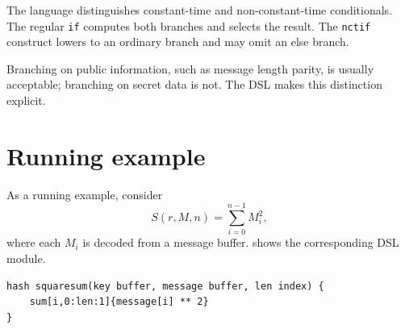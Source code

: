The language distinguishes constant-time and non-constant-time conditionals. The regular \texttt{if} computes both branches and selects the result. The \texttt{nctif} construct lowers to an ordinary branch and may omit an else branch.

Branching on public information, such as message length parity, is usually acceptable; branching on secret data is not. The DSL makes this distinction explicit.

\section{Running example}
As a running example, consider
\[
    S(r, M,n)=\sum_{i=0}^{n-1} M_i^2,
\]
where each \(M_i\) is decoded from a message buffer.  shows the corresponding DSL module.

\begin{lstlisting}[style=thesisBNF,caption={DSL expression for the running square-sum example.},label={lst:squaresum-dsl}]
hash squaresum(key buffer, message buffer, len index) {
    sum[i,0:len:1]{message[i] ** 2}
}
\end{lstlisting}
